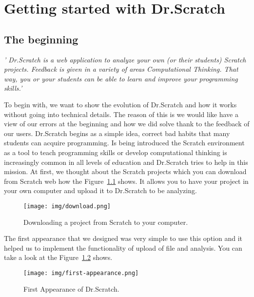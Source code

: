 \documentclass[a4paper, 12pt]{book}
\begin{document}
\mainmatter
\cleardoublepage
{} %
\chapter{Getting started with Dr.Scratch}
\label{sec:beginning} %
\section{The beginning} 
\setlength{\parskip}{8mm}
\textsl{'
Dr.Scratch is a web application to analyze your own (or their students) Scratch
projects. Feedback is given in a variety of areas Computational Thinking. That
way, you or your students can be able to learn and improve your programming
skills.'}

To begin with, we want to show the evolution of Dr.Scratch and how it works
without going into technical details. The reason of this is we would like have
a view of our errors at the beginning and how we did solve thank to the
feedback of our users.
Dr.Scratch begins as a simple idea, correct bad habits that many students can
acquire programming. Is being introduced the Scratch environment as a tool to
teach programming skills or develop computational thinking is increasingly
common in all levels of education and Dr.Scratch tries to help in this mission.
At first, we thought about the Scratch projects which you can download from
Scratch web how the Figure~\ref{figure:download} shows. It allows you to have 
your project in your own computer and upload it to
Dr.Scratch to be analyzing. 

\begin{figure}
    \centering
    \texttt{[image: img/download.png]}
    \caption{Downloading a project from Scratch to your computer.}
    \label{figure:download}
\end{figure}

The first appearance that we designed was very simple to use this option and it 
helped us to implement the functionality of upload of file and analysis. You
can take a look at the Figure~\ref{figure:first-appearance} shows.

 \begin{figure}
   	\centering
   	\texttt{[image: img/first-appearance.png]}
   	\caption{First Appearance of Dr.Scratch.}
   	\label{figure:first-appearance}
\end{figure}
\end{document}
